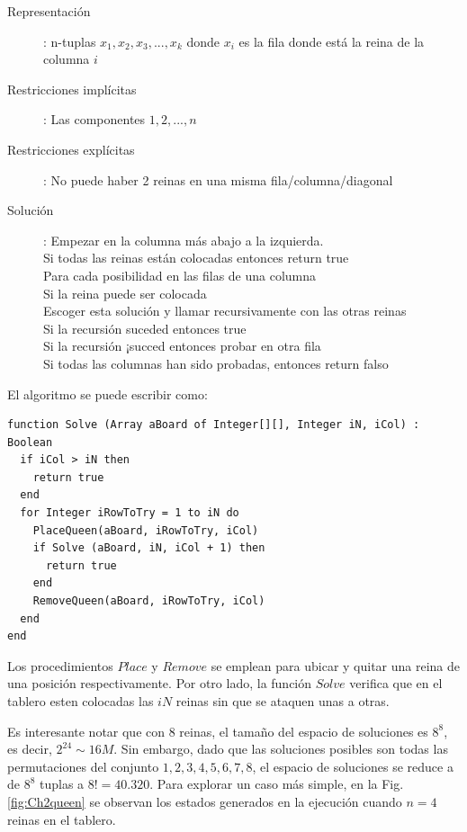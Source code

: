 \begin{description}
\item [Representación]: n-tuplas $x_1, x_2, x_3,..., x_k$ donde $x_i$ es la fila donde está la reina de la columna $i$
\item [Restricciones implícitas]: Las componentes $1, 2,..., n$
\item [Restricciones explícitas]: No puede haber 2 reinas en una misma fila/columna/diagonal
\item [Solución]: Empezar en la columna más abajo a la izquierda. \\
Si todas las reinas están colocadas entonces return true \\
Para cada posibilidad en las filas de una columna \\
    Si la reina puede ser colocada \\
    Escoger esta solución y llamar recursivamente con las otras reinas \\
    Si la recursión suceded entonces true \\
    Si la recursión ¡succed entonces probar en otra fila \\
Si todas las columnas han sido probadas, entonces return falso \\
\end{description}

El algoritmo se puede escribir como: 

\begin{lstlisting}[upquote=true, language=pseudo]
function Solve (Array aBoard of Integer[][], Integer iN, iCol) : Boolean
  if iCol > iN then
    return true
  end
  for Integer iRowToTry = 1 to iN do
    PlaceQueen(aBoard, iRowToTry, iCol)
    if Solve (aBoard, iN, iCol + 1) then
      return true
    end
    RemoveQueen(aBoard, iRowToTry, iCol)
  end
end
\end{lstlisting}

Los procedimientos $Place$ y $Remove$ se emplean para ubicar y quitar una reina de una posición respectivamente. Por otro lado, la función $Solve$ verifica que en el tablero esten colocadas las $iN$ reinas sin que se ataquen unas a otras.

Es interesante notar que con 8 reinas, el tamaño del espacio de soluciones es $8^8$, es decir, $2^{24} \sim 16M$. Sin embargo, dado que las soluciones posibles son todas las permutaciones del conjunto ${1,2,3,4,5,6,7,8}$, el espacio de soluciones se reduce a de $8^8$ tuplas a $8! = 40.320$. Para explorar un caso más simple, en la Fig. \ref{fig:Ch2queen} se observan los estados generados en la ejecución cuando $n=4$ reinas en el tablero.

